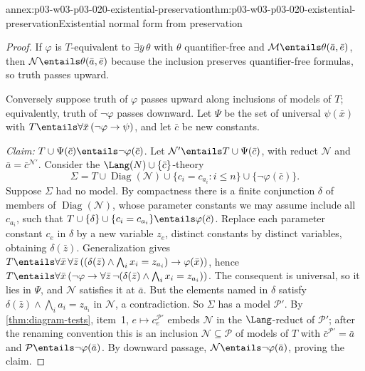 \begin{annexitem}{annex:p03-w03-p03-020-existential-preservation}{thm:p03-w03-p03-020-existential-preservation}{Existential normal form from preservation}
\begin{proof}
If \(\varphi\) is \(T\)-equivalent to \(\exists\bar y\,\theta\) with
\(\theta\) quantifier-free and \(\mathcal M\entails\theta(\bar a,\bar e)\),
then \(\mathcal N\entails\theta(\bar a,\bar e)\) because the inclusion
preserves quantifier-free formulas, so truth passes upward.

Conversely suppose truth of \(\varphi\) passes upward along inclusions of
models of \(T\); equivalently, truth of \(\neg\varphi\) passes downward.
Let \(\Psi\) be the set of universal \(\psi(\bar x)\) with
\(T\entails\forall\bar x\,(\neg\varphi\to\psi)\), and let \(\bar c\) be
new constants.

\emph{Claim:} \(T\cup\Psi(\bar c)\entails\neg\varphi(\bar c)\). Let
\(\mathcal N'\entails T\cup\Psi(\bar c)\), with reduct \(\mathcal N\) and
\(\bar a=\bar c^{\mathcal N'}\). Consider the \(\Lang(N)\cup\{\bar c\}\)-theory
\[
 \Sigma=T\cup\operatorname{Diag}(\mathcal N)\cup
 \{c_i=c_{a_i}:i\le n\}\cup\{\neg\varphi(\bar c)\}.
\]
Suppose \(\Sigma\) had no model. By compactness there is a finite
conjunction \(\delta\) of members of \(\operatorname{Diag}(\mathcal N)\),
whose parameter constants we may assume include all \(c_{a_i}\), such that
\(T\cup\{\delta\}\cup\{c_i=c_{a_i}\}\entails\varphi(\bar c)\). Replace each
parameter constant \(c_e\) in \(\delta\) by a new variable \(z_e\), distinct
constants by distinct variables, obtaining \(\delta(\bar z)\). Generalization
gives
\(T\entails\forall\bar x\,\forall\bar z\,
((\delta(\bar z)\land\bigwedge_i x_i=z_{a_i})\to\varphi(\bar x))\), hence
\(T\entails\forall\bar x\,(\neg\varphi\to
\forall\bar z\,\neg(\delta(\bar z)\land\bigwedge_i x_i=z_{a_i}))\). The
consequent is universal, so it lies in \(\Psi\), and
\(\mathcal N\) satisfies it at \(\bar a\). But the elements named in
\(\delta\) satisfy \(\delta(\bar z)\land\bigwedge_i a_i=z_{a_i}\) in
\(\mathcal N\), a contradiction. So \(\Sigma\) has a model \(\mathcal P'\).
By \cref{thm:diagram-tests}, item~1, \(e\mapsto c_e^{\mathcal P'}\) embeds
\(\mathcal N\) in the \(\Lang\)-reduct of \(\mathcal P'\); after the
renaming convention this is an inclusion \(\mathcal N\subseteq\mathcal P\)
of models of \(T\) with \(\bar c^{\mathcal P'}=\bar a\) and
\(\mathcal P\entails\neg\varphi(\bar a)\). By downward passage,
\(\mathcal N\entails\neg\varphi(\bar a)\), proving the claim.


\end{proof}
\end{annexitem}
